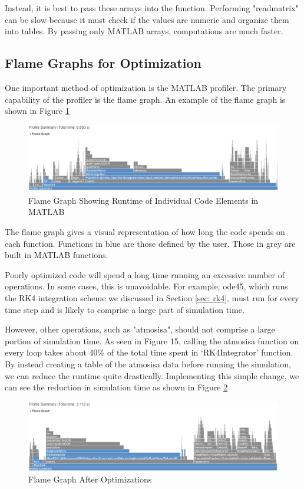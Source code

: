 \documentclass[12pt]{report}
\begin{document}
Instead, it is best to pass these arrays into the function. Performing "readmatrix" can be slow because it must check if the values are numeric and organize them into tables. By passing only MATLAB arrays, computations are much faster.
\subsection{Flame Graphs for Optimization}
One important method of optimization is the MATLAB profiler. The primary capability of the profiler is the flame graph. An example of the flame graph is shown in Figure \ref{fig:flame1}

\begin{figure}[ht]
    \centering
    \includegraphics[width=\linewidth]{Images/FlameGraph1.png}
    \caption{Flame Graph Showing Runtime of Individual Code Elements in MATLAB}
    \label{fig:flame1}
\end{figure}

The flame graph gives a visual representation of how long the code spends on each function. Functions in blue are those defined by the user. Those in grey are built in MATLAB functions.

Poorly optimized code will spend a long time running an excessive number of operations. In some cases, this is unavoidable. For example, ode45, which runs the RK4 integration scheme we discussed in Section \ref{sec: rk4}, must run for every time step and is likely to comprise a large part of simulation time.

However, other operations, such as "atmosisa", should not comprise a large portion of simulation time. As seen in Figure 15, calling the atmosisa function on every loop takes about 40\% of the total time spent in ‘RK4Integrator’ function. By instead creating a table of the atmosisa data before running the simulation, we can reduce the runtime quite drastically. Implementing this simple change, we can see the reduction in simulation time as shown in Figure \ref{fig:flame2}

\begin{figure}
    \centering
    \includegraphics[width=\linewidth]{Images/FlameGraph2.png}
    \caption{Flame Graph After Optimizations}
    \label{fig:flame2}
\end{figure}
\end{document}
